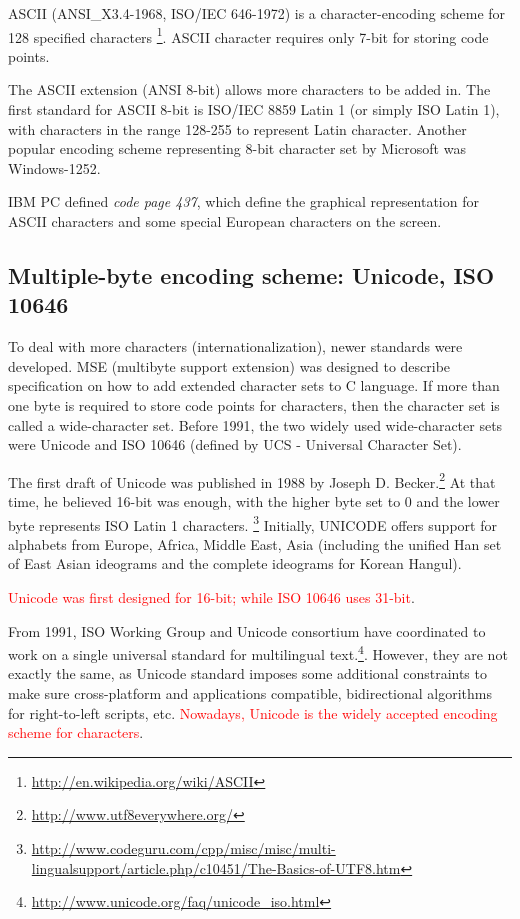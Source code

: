 ASCII (ANSI\_X3.4-1968, ISO/IEC 646-1972) is a character-encoding scheme for 128
specified characters \footnote{\url{http://en.wikipedia.org/wiki/ASCII}}. ASCII
character requires only 7-bit for storing code points. 

The ASCII extension (ANSI 8-bit) allows more characters to be added in. 
The first standard for ASCII 8-bit is ISO/IEC 8859 Latin 1 (or simply ISO Latin
1), with characters in the range 128-255 to represent Latin character. Another
popular encoding scheme representing 8-bit character set by Microsoft was
Windows-1252.

IBM PC defined {\it code page 437}, which define the graphical representation
for ASCII characters and some special European characters on the screen. 

\subsection{Multiple-byte encoding scheme: Unicode, ISO 10646}

To deal with more characters (internationalization), newer standards were
developed. MSE (multibyte support extension) was designed to describe
specification on how to add extended character sets to C language. If more than
one byte is required to store code points for characters, then the character set
is called a wide-character set.
Before 1991, the two widely used wide-character sets were Unicode
and ISO 10646 (defined by UCS - Universal Character Set).

The first draft of Unicode was published in 1988 by Joseph D.
Becker.\footnote{\url{http://www.utf8everywhere.org/}} At that time, he believed
16-bit was enough, with the higher byte set to 0 and the lower byte represents
ISO Latin 1 characters.
\footnote{\url{http://www.codeguru.com/cpp/misc/misc/multi-lingualsupport/article.php/c10451/The-Basics-of-UTF8.htm}}
Initially, UNICODE offers support for alphabets from Europe, Africa, Middle
East, Asia (including the unified Han set of East Asian ideograms and the
complete ideograms for Korean Hangul).

\textcolor{red}{Unicode was first designed for 16-bit; while ISO 10646 uses
31-bit}.

From 1991, ISO Working Group and Unicode consortium have coordinated to work on
a single universal standard for multilingual
text.\footnote{\url{http://www.unicode.org/faq/unicode_iso.html}}. However, they
are not exactly the same, as Unicode standard imposes some additional
constraints to make sure cross-platform and applications compatible,
bidirectional algorithms for right-to-left scripts, etc.
\textcolor{red}{Nowadays, Unicode is the widely accepted encoding scheme for
characters}.

